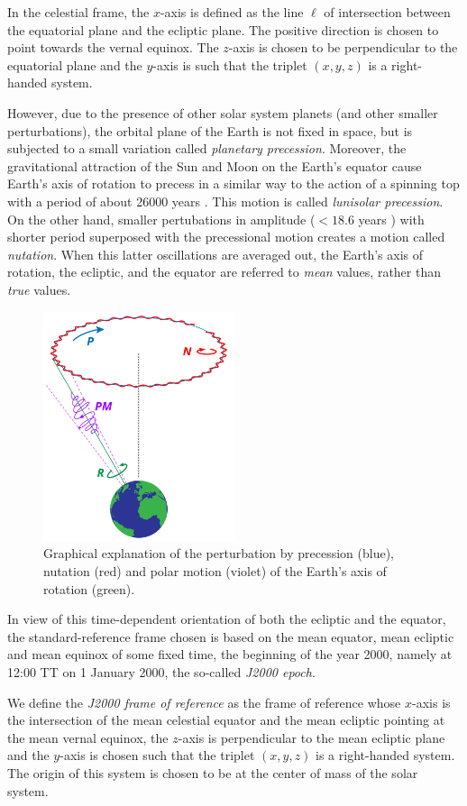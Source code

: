 \documentclass[../main.tex]{subfiles}
\begin{document}
In the celestial frame, the $x$-axis is defined as the line $\ell$ of intersection between the equatorial plane and the ecliptic plane. The positive direction is chosen to point towards the vernal equinox. The $z$-axis is chosen to be perpendicular to the equatorial plane and the $y$-axis is such that the triplet $(x,y,z)$ is a right-handed system.

However, due to the presence of other solar system planets (and other smaller perturbations), the orbital plane of the Earth is not fixed in space, but is subjected to a small variation called \emph{planetary precession}. Moreover, the gravitational attraction of the Sun and Moon on the Earth's equator cause Earth's axis of rotation to precess in a similar way to the action of a spinning top with a period of about 26000 years \cite{montenbruck}. This motion is called \emph{lunisolar precession}. On the other hand, smaller pertubations in amplitude ($<18.6$ years \cite{wiki:eci}) with shorter period superposed with the precessional motion creates a motion called \emph{nutation}. When this latter oscillations are averaged out, the Earth's axis of rotation, the ecliptic, and the equator are referred to \emph{mean} values, rather than \emph{true} values.

\begin{figure}[ht]
  \centering
  \includegraphics[width=0.5\textwidth]{Images/precession_nutation.pdf}
  \caption{Graphical explanation of the perturbation by precession (blue), nutation (red) and polar motion (violet) of the Earth's axis of rotation (green). }
  \label{fig:prec_nut}
\end{figure}

In view of this time-dependent orientation of both the ecliptic and the equator, the standard-reference frame chosen is based on the mean equator, mean ecliptic and mean equinox of some fixed time, the beginning of the year 2000, namely at 12:00 TT on 1 January 2000, the so-called \emph{J2000 epoch}.
\begin{definition}
  We define the \emph{J2000 frame of reference} as the frame of reference whose $x$-axis is the intersection of the mean celestial equator and the mean ecliptic pointing at the mean vernal equinox, the $z$-axis is perpendicular to the mean ecliptic plane and the $y$-axis is chosen such that the triplet $(x,y,z)$ is a right-handed system. The origin of this system is chosen to be at the center of mass of the solar system.
\end{definition}
\end{document}
